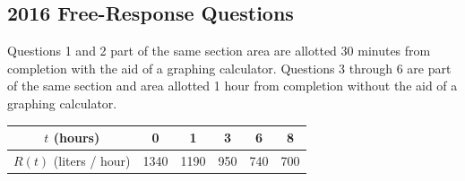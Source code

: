 \subsection{2016 Free-Response Questions}
Questions 1 and 2 part of the same section area are allotted 30 minutes from completion with the aid of a graphing calculator.
Questions 3 through 6 are part of the same section and area allotted 1 hour from completion without the aid of a graphing calculator.

\begin{table}[H]
	\begin{center}
		\begin{tabular}{|c||c|c|c|c|c|}
			\hline
			$t$ (hours) & 0 & 1 & 3 & 6 & 8 \\
			\hline
			$R(t)$ (liters / hour) & 1340 & 1190 & 950 & 740 & 700 \\
			\hline
		\end{tabular}
	\end{center}
\end{table}

